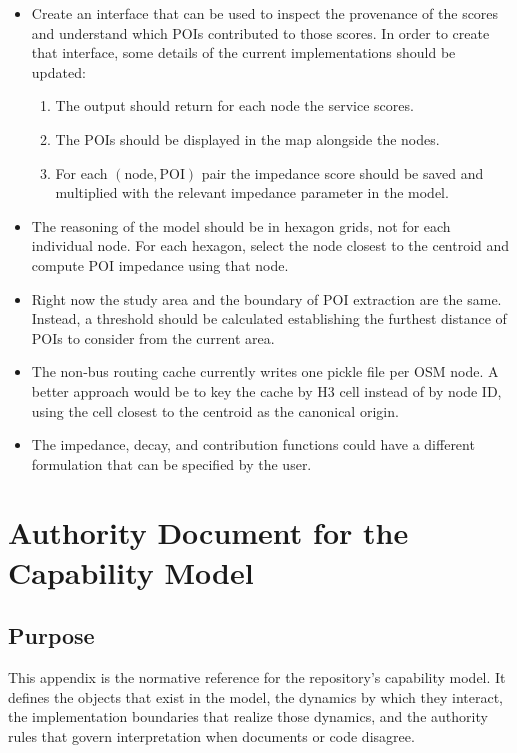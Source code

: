 \documentclass[11pt]{article}
\begin{document}
\begin{itemize}
  \item Create an interface that can be used to inspect the provenance of the scores and understand which POIs contributed to those scores. In order to create that interface, some details of the current implementations should be updated:
  \begin{enumerate}
    \item The output should return for each node the service scores.
    \item The POIs should be displayed in the map alongside the nodes.
    \item For each \((\text{node}, \text{POI})\) pair the impedance score should be saved and multiplied with the relevant impedance parameter in the model.
  \end{enumerate}
  \item The reasoning of the model should be in hexagon grids, not for each individual node. For each hexagon, select the node closest to the centroid and compute POI impedance using that node.
  \item Right now the study area and the boundary of POI extraction are the same. Instead, a threshold should be calculated establishing the furthest distance of POIs to consider from the current area.
  \item The non-bus routing cache currently writes one pickle file per OSM node. A better approach would be to key the cache by H3 cell instead of by node ID, using the cell closest to the centroid as the canonical origin.
  \item The impedance, decay, and contribution functions could have a different formulation that can be specified by the user.
\end{itemize}

\clearpage
\appendix
\section{Authority Document for the Capability Model}

\subsection*{Purpose}

This appendix is the normative reference for the repository's capability model. It defines the objects that exist in the model, the dynamics by which they interact, the implementation boundaries that realize those dynamics, and the authority rules that govern interpretation when documents or code disagree.
\end{document}
